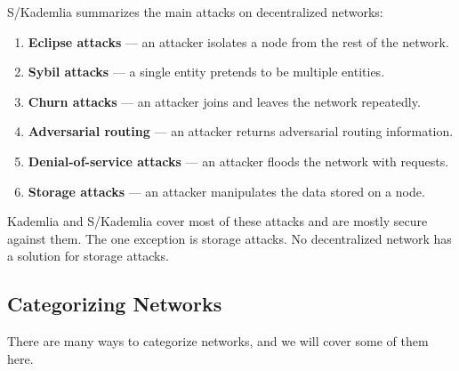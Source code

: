 S/Kademlia \cite{skademlia} summarizes the main attacks on decentralized networks:
\begin{enumerate}
    \item \textbf{Eclipse attacks} --- an attacker isolates a node from the rest of the network.
    \item \textbf{Sybil attacks} --- a single entity pretends to be multiple entities.
    \item \textbf{Churn attacks} --- an attacker joins and leaves the network repeatedly.
    \item \textbf{Adversarial routing} --- an attacker returns adversarial routing information.
    \item \textbf{Denial-of-service attacks} --- an attacker floods the network with requests.
    \item \textbf{Storage attacks} --- an attacker manipulates the data stored on a node.
\end{enumerate}

Kademlia and S/Kademlia cover most of these attacks and are mostly secure against them.
The one exception is storage attacks.
No decentralized network has a solution for storage attacks.

\subsection{Categorizing Networks}

There are many ways to categorize networks, and we will cover some of them here.

